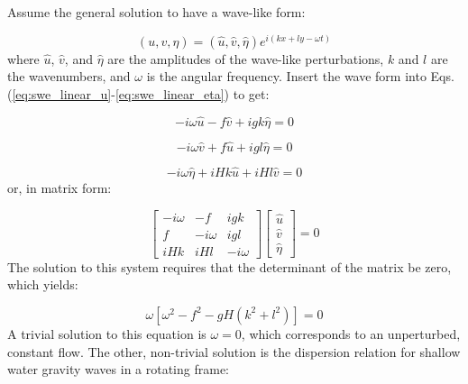 \documentclass[12pt]{article}
\numberwithin{equation}{section}
\numberwithin{figure}{section}
\numberwithin{table}{section}
\begin{document}
Assume the general solution to have a wave-like form:

\begin{equation}
  (u, v, \eta) = (\widehat{u}, \widehat{v}, \widehat{\eta}) e^{i(kx + ly - \omega t)}
\end{equation}
where $\widehat{u}$, $\widehat{v}$, and $\widehat{\eta}$ are the amplitudes of the
wave-like perturbations, $k$ and $l$ are the wavenumbers, and $\omega$ is the
angular frequency.
Insert the wave form into Eqs. (\ref{eq:swe_linear_u}-\ref{eq:swe_linear_eta})
to get:

\begin{equation}
  - i \omega \widehat{u} - f \widehat{v} + i g k \widehat{\eta} = 0
\end{equation}

\begin{equation}
  - i \omega \widehat{v} + f \widehat{u} + i g l \widehat{\eta} = 0
\end{equation}

\begin{equation}
  - i \omega \widehat{\eta} + i H k \widehat{u} + i H l \widehat{v} = 0
\end{equation}
or, in matrix form:

\begin{equation}
  \begin{bmatrix}
    - i \omega & - f        & i g k \\
    f          & - i \omega & i g l \\
    i H k      & i H l      & - i \omega
  \end{bmatrix}
  \begin{bmatrix}
    \widehat{u} \\
    \widehat{v} \\
    \widehat{\eta}
  \end{bmatrix} = 0
\end{equation}
The solution to this system requires that the determinant of the matrix be zero,
which yields:

\begin{equation}
  \omega[\omega^2 - f^2 - gH(k^2 + l^2)] = 0
  \label{eq:swe_determinant}
\end{equation}
A trivial solution to this equation is $\omega = 0$, which corresponds to an
unperturbed, constant flow.
The other, non-trivial solution is the dispersion relation for shallow water
gravity waves in a rotating frame:
\end{document}
